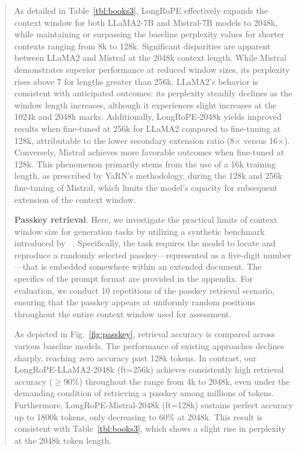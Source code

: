 \begin{abstract}
As detailed in Table~\ref{tbl:books3}, LongRoPE effectively expands the context window for both LLaMA2-7B and Mistral-7B models to 2048k, while maintaining or surpassing the baseline perplexity values for shorter contexts ranging from 8k to 128k. Significant disparities are apparent between LLaMA2 and Mistral at the 2048k context length. While Mistral demonstrates superior performance at reduced window sizes, its perplexity rises above 7 for lengths greater than 256k. LLaMA2’s behavior is consistent with anticipated outcomes: its perplexity steadily declines as the window length increases, although it experiences slight increases at the 1024k and 2048k marks. Additionally, LongRoPE-2048k yields improved results when fine-tuned at 256k for LLaMA2 compared to fine-tuning at 128k, attributable to the lower secondary extension ratio (8$\times$ versus 16$\times$). Conversely, Mistral achieves more favorable outcomes when fine-tuned at 128k. This phenomenon primarily stems from the use of a 16k training length, as prescribed by YaRN's methodology, during the 128k and 256k fine-tuning of Mistral, which limits the model’s capacity for subsequent extension of the context window.

\textbf{Passkey retrieval}. Here, we investigate the practical limits of context window size for generation tasks by utilizing a synthetic benchmark introduced by ~\cite{passkey}. Specifically, the task requires the model to locate and reproduce a randomly selected passkey—represented as a five-digit number—that is embedded somewhere within an extended document. The specifics of the prompt format are provided in the appendix. For evaluation, we conduct 10 repetitions of the passkey retrieval scenario, ensuring that the passkey appears at uniformly random positions throughout the entire context window used for assessment.

As depicted in Fig.~\ref{fig:passkey}, retrieval accuracy is compared across various baseline models. The performance of existing approaches declines sharply, reaching zero accuracy past 128k tokens. In contrast, our LongRoPE-LLaMA2-2048k (ft=256k) achieves consistently high retrieval accuracy ($\ge$90\%) throughout the range from 4k to 2048k, even under the demanding condition of retrieving a passkey among millions of tokens. Furthermore, LongRoPE-Mistral-2048k (ft=128k) sustains perfect accuracy up to 1800k tokens, only decreasing to 60\% at 2048k. This result is consistent with Table~\ref{tbl:books3}, which shows a slight rise in perplexity at the 2048k token length.


\end{abstract}
